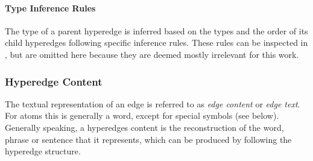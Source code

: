 \documentclass[11pt]{scrreprt}
\let\citef\cite  %
\let\cite\parencite  %
\begin{document}

\paragraph{Type Inference Rules}
The type of a parent hyperedge is inferred based on the types and the order of its child hyperedges following specific inference rules. These rules can be inspected in \citef[p. 8]{menezesSemanticHypergraphs2021}, but are omitted here because they are deemed mostly irrelevant for this work.


\subsubsection{Hyperedge Content}
The textual representation of an edge is referred to as \textit{edge content} or \textit{edge text}. For atoms this is generally a word, except for special symbols (see below). Generally speaking, a hyperedges content is the reconstruction of the word, phrase or sentence that it represents, which can be produced by following the hyperedge structure.
\end{document}
